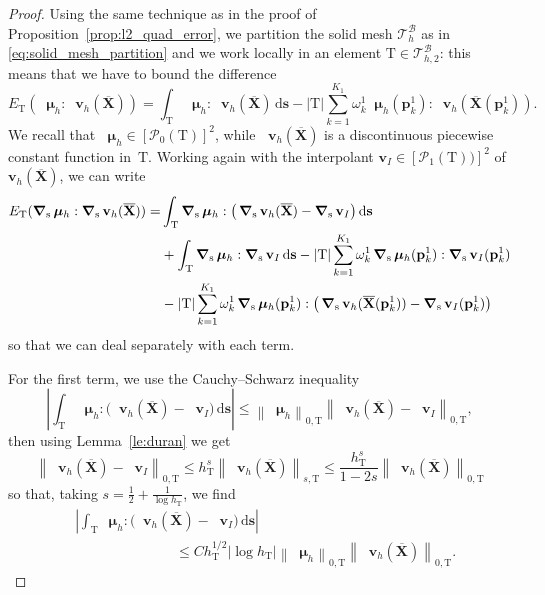 \documentclass[10pt,a4paper]{amsart}
\newcommand\B{\mathcal B} %
\newcommand\BD{\end{color}}
\newcommand\DB{\begin{color}{black}}
\newcommand\Pcal{\mathcal{P}}
\newcommand\T{\mathcal{T}} %
\newcommand\X{\mathbf{X}} %
\newcommand\Xbar{\overline{\X}} %
\newcommand{\abs}[1]{\left\lvert#1\right\rvert}
\newcommand\ds{\mathrm{d}\s} %
\DeclareMathOperator{\grads}{\boldsymbol\nabla_s}
\newcommand\mmu{{\boldsymbol\mu}} %
\newcommand{\norm}[1]{\left\lVert#1\right\rVert}
\newcommand\quadnode{\mathbf{p}}
\newcommand\quadweigth{\omega}
\newcommand\s{\mathbf{s}} %
\newcommand\tri{\mathrm{T}} %
\renewcommand\v{\mathbf{v}} %
\begin{document}
	\begin{proof}
		Using the same technique as in the proof of Proposition~\ref{prop:l2_quad_error},
		we partition the solid mesh $\T_h^\B$ as in
		\eqref{eq:solid_mesh_partition} and we work locally in an element
		$\tri\in\T_{h,2}^\B$: this means that we have to bound the difference
		\begin{equation}
			E_\tri(\grads\mmu_h:\grads\v_h(\Xbar)) = \int_\tri
			\grads\mmu_h:\grads\v_h(\Xbar)\,\ds -
			\abs{\tri}\sum_{k=1}^{K_1}\quadweigth_k^1\grads\mmu_h(\quadnode_k^1):
			\grads\v_h(\Xbar(\quadnode_k^1)).
		\end{equation}
		We recall that $\grads\mmu_h\in[\Pcal_0(\tri)]^2$, while $\grads\v_h(\Xbar)$ is
		a discontinuous piecewise constant function in~$\tri$.
		Working again with the interpolant $\v_I\in[\Pcal_1(\tri))]^2$ of $\v_h(\Xbar)$,
		we can write
		\begin{equation}\label{eq:manipulation_h1}
			\begin{aligned}
				E_\tri(\grads\mmu_h:\grads\v_h(\Xbar)) = &\int_\tri \grads\mmu_h:\big(\grads\v_h(\Xbar)-\grads\v_I\big)\,\ds\\
				&+ \int_\tri \grads\mmu_h:\grads\v_I\,\ds - \abs{\tri}\sum_{k=1}^{K_1}\quadweigth_k^1\grads\mmu_h(\quadnode_k^1):\grads\v_I(\quadnode_k^1)\\
				&\DB-\BD  \abs{\tri} \sum_{k=1}^{K_1}\quadweigth_k^1 \grads\mmu_h(\quadnode_k^1): \big(\grads\v_h(\Xbar(\quadnode_k^1))-\grads\v_I(\quadnode_k^1)\big)
			\end{aligned}
		\end{equation}
		so that we can deal separately with each term.
		
		For the first term, we use the Cauchy--Schwarz inequality
		\begin{equation}
			\abs{\int_\tri
				\grads\mmu_h:\big(\grads\v_h(\Xbar)-\grads\v_I\big)\,\ds}\le
			\norm{\grads\mmu_h}_{0,\tri} \norm{\grads\v_h(\Xbar)-\grads\v_I}_{0,\tri},
		\end{equation}
		then using Lemma~\ref{le:duran} we get
		\[
		\norm{\grads\v_h(\Xbar)-\grads\v_I}_{0,\tri}
		\le h_\tri^s\norm{\grads\v_h(\Xbar)}_{s,\tri}
		\le \frac{h_\tri^s}{1-2s}\norm{\grads\v_h(\Xbar)}_{0,\tri}
		\]
		so that, taking $s=\frac12+\frac1{\log h_\tri}$, we find
		\begin{equation}
			\begin{aligned}
				&\abs{\int_\tri \grads\mmu_h:\big(\grads\v_h(\Xbar)-\grads\v_I\big)\,\ds}\\
				&\hspace{3cm}\le Ch_\tri^{1/2}\abs{\log h_\tri} \norm{\grads\mmu_h}_{0,\tri}\norm{\grads\v_h(\Xbar)}_{0,\tri}.
			\end{aligned}
		\end{equation}
		

\end{proof}
\end{document}
